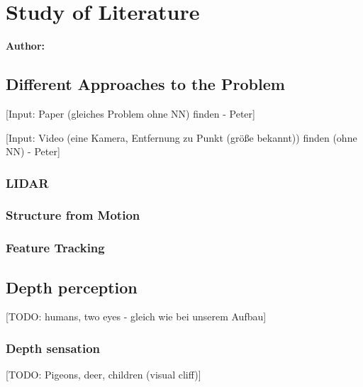 \chapter{Study of Literature}

\textbf{Author: } 

\section{Different Approaches to the Problem}
[Input: Paper (gleiches Problem ohne NN) finden - Peter]

[Input: Video (eine Kamera, Entfernung zu Punkt (größe bekannt)) finden (ohne NN) - Peter]

\subsection{LIDAR}

\subsection{Structure from Motion}

\subsection{Feature Tracking}

\section{Depth perception}
[TODO: humans, two eyes - gleich wie bei unserem Aufbau]

\subsection{Depth sensation}
[TODO: Pigeons, deer, children (visual cliff)]

\filbreak
